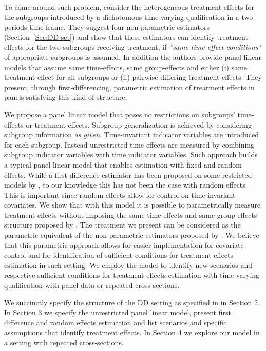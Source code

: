 \documentclass[12pt]{article}
\begin{document}
To come around such problem, \cite{lee2014difference} consider the heterogeneous treatment effects for the subgroups introduced by a dichotomous time-varying qualification in a two-periods time frame. They suggest four non-parametric estimators (Section~\vref{Sec:DD-set}) and show that these estimators can identify treatment effects for the two subgroups receiving treatment, if \textit{''same time-effect conditions"} of appropriate subgroups is assumed. In addition the authors provide panel linear models that assume same time-effects, same group-effects and either (i) same treatment effect for all subgroups or (ii) pairwise differing treatment effects. They present, through first-differencing, parametric estimation of treatment effects in panels satisfying this kind of structure. 

We propose a panel linear model that poses no restrictions on subgroups' time-effects or treatment-effects. Subgroup generalization is achieved by considering subgroup information \textit{as given}. Time-invariant indicator variables are introduced for each subgroup. Instead unrestricted time-effects are measured by combining subgroup indicator variables with time indicator variables. Such approach builds a typical panel linear model that enables estimation with fixed and random effects. While a first difference estimator has been proposed on some restricted models by \cite{lee2014difference}, to our knowledge this has not been the case with random effects. This is important since random effects allow for control on time-invariant covariates. We show that with this model  it is possible to parametrically measure treatment effects without imposing the same time-effects and same group-effects structure proposed by \cite{lee2014difference}. The treatment we present can be considered as the parametric equivalent of the non-parametric estimators proposed by \cite{lee2014difference}. We believe that this parametric approach allows for easier implementation for covariate control and for identification of sufficient conditions for treatment effects estimation in such setting. We employ the model to identify new scenarios and respective sufficient conditions for treatment effects estimation with time-varying qualification with panel data or repeated cross-sections.

We succinctly specify the structure of the DD setting as specified in \cite{lee2014difference} in Section 2. In Section 3 we specify the unrestricted panel linear model, present first difference and random effects estimation and list scenarios and specific assumptions that identify treatment effects. In Section 4 we explore our model in a setting with repeated cross-sections.
 
\end{document}
